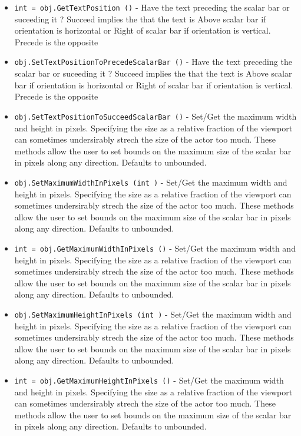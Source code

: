 \begin{itemize}
\item  \verb|int = obj.GetTextPosition ()| -  Have the text preceding the scalar bar or suceeding it ?
 Succeed implies the that the text is Above scalar bar if orientation 
 is horizontal or Right of scalar bar if orientation is vertical.
 Precede is the opposite

\item  \verb|obj.SetTextPositionToPrecedeScalarBar ()| -  Have the text preceding the scalar bar or suceeding it ?
 Succeed implies the that the text is Above scalar bar if orientation 
 is horizontal or Right of scalar bar if orientation is vertical.
 Precede is the opposite

\item  \verb|obj.SetTextPositionToSucceedScalarBar ()| -  Set/Get the maximum width and height in pixels. Specifying the size as
 a relative fraction of the viewport can sometimes undersirably strech 
 the size of the actor too much. These methods allow the user to set 
 bounds on the maximum size of the scalar bar in pixels along any 
 direction. Defaults to unbounded.

\item  \verb|obj.SetMaximumWidthInPixels (int )| -  Set/Get the maximum width and height in pixels. Specifying the size as
 a relative fraction of the viewport can sometimes undersirably strech 
 the size of the actor too much. These methods allow the user to set 
 bounds on the maximum size of the scalar bar in pixels along any 
 direction. Defaults to unbounded.

\item  \verb|int = obj.GetMaximumWidthInPixels ()| -  Set/Get the maximum width and height in pixels. Specifying the size as
 a relative fraction of the viewport can sometimes undersirably strech 
 the size of the actor too much. These methods allow the user to set 
 bounds on the maximum size of the scalar bar in pixels along any 
 direction. Defaults to unbounded.

\item  \verb|obj.SetMaximumHeightInPixels (int )| -  Set/Get the maximum width and height in pixels. Specifying the size as
 a relative fraction of the viewport can sometimes undersirably strech 
 the size of the actor too much. These methods allow the user to set 
 bounds on the maximum size of the scalar bar in pixels along any 
 direction. Defaults to unbounded.

\item  \verb|int = obj.GetMaximumHeightInPixels ()| -  Set/Get the maximum width and height in pixels. Specifying the size as
 a relative fraction of the viewport can sometimes undersirably strech 
 the size of the actor too much. These methods allow the user to set 
 bounds on the maximum size of the scalar bar in pixels along any 
 direction. Defaults to unbounded.

\end{itemize}

